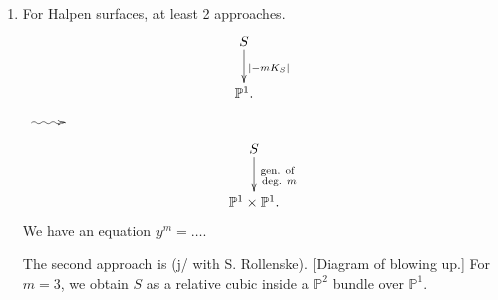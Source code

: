 
\begin{enumerate}
\item [(3)]
For Halpen surfaces,
at least 2 approaches.
$$
\xymatrix{
S \ar[d]^{|-m K_S|}\\
\mathbb{P}^1.
}
$$
$\xymatrix{\ar@{~>}[r]&}$
$$
\xymatrix{
S \ar[d]^{\substack{\text{gen. of} \\ \text{
deg. }m}}\\
\mathbb{P}^1 \times \mathbb{P}^1.
}
$$
We have an equation $y^m=…$.

The second approach is (j/ with S.
Rollenske).
[Diagram of blowing up.]
For $m=3$, we obtain $S$ as a relative cubic
inside a $\mathbb{P}^2$
bundle over $\mathbb{P}^1$.
\end{enumerate}



